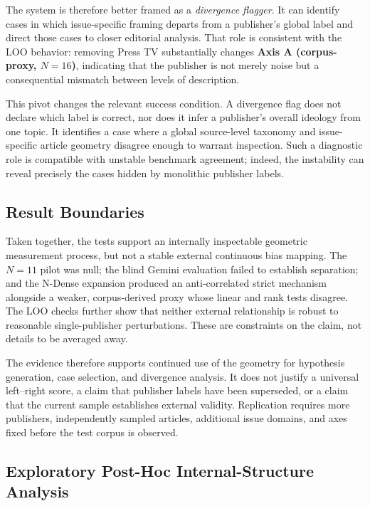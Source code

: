 The system is therefore better framed as a \emph{divergence flagger}. It can identify cases in
which issue-specific framing departs from a publisher's global label and direct those cases to
closer editorial analysis. That role is consistent with the LOO behavior: removing Press TV
substantially changes \textbf{Axis A (corpus-proxy, $N=16$)}, indicating that the publisher is
not merely noise but a consequential mismatch between levels of description.

This pivot changes the relevant success condition. A divergence flag does not declare which
label is correct, nor does it infer a publisher's overall ideology from one topic. It identifies a
case where a global source-level taxonomy and issue-specific article geometry disagree enough to
warrant inspection. Such a diagnostic role is compatible with unstable benchmark agreement;
indeed, the instability can reveal precisely the cases hidden by monolithic publisher labels.

\subsection{Result Boundaries}

Taken together, the tests support an internally inspectable geometric measurement process, but
not a stable external continuous bias mapping. The $N=11$ pilot was null; the blind Gemini
evaluation failed to establish separation; and the N-Dense expansion produced an
anti-correlated strict mechanism alongside a weaker, corpus-derived proxy whose linear and rank
tests disagree. The LOO checks further show that neither external relationship is robust to
reasonable single-publisher perturbations. These are constraints on the claim, not details to be
averaged away.

The evidence therefore supports continued use of the geometry for hypothesis generation,
case selection, and divergence analysis. It does not justify a universal left--right score, a
claim that publisher labels have been superseded, or a claim that the current sample establishes
external validity. Replication requires more publishers, independently sampled articles,
additional issue domains, and axes fixed before the test corpus is observed.

\subsection{Exploratory Post-Hoc Internal-Structure Analysis}

